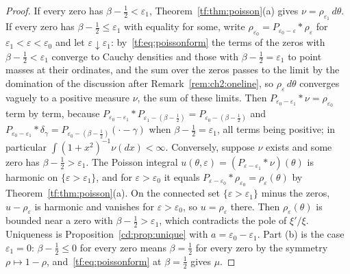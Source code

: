 \begin{proof}
If every zero has $\beta-\tfrac12<\varepsilon_1$, Theorem~\ref{tf:thm:poisson}(a) gives $\nu=\rho_{\varepsilon_1}\,d\theta$. If every zero has $\beta-\tfrac12\le\varepsilon_1$ with equality for some, write $\rho_{\varepsilon_0}=P_{\varepsilon_0-\varepsilon}*\rho_\varepsilon$ for $\varepsilon_1<\varepsilon<\varepsilon_0$ and let $\varepsilon\downarrow\varepsilon_1$: by~\eqref{tf:eq:poissonform} the terms of the zeros with $\beta-\tfrac12<\varepsilon_1$ converge to Cauchy densities and those with $\beta-\tfrac12=\varepsilon_1$ to point masses at their ordinates, and the sum over the zeros passes to the limit by the domination of the discussion after Remark~\ref{rem:ch2:oneline}, so $\rho_\varepsilon\,d\theta$ converges vaguely to a positive measure $\nu$, the sum of these limits. Then $P_{\varepsilon_0-\varepsilon_1}*\nu=\rho_{\varepsilon_0}$ term by term, because $P_{\varepsilon_0-\varepsilon_1}*P_{\varepsilon_1-(\beta-\frac12)}=P_{\varepsilon_0-(\beta-\frac12)}$ and $P_{\varepsilon_0-\varepsilon_1}*\delta_\gamma=P_{\varepsilon_0-(\beta-\frac12)}(\cdot-\gamma)$ when $\beta-\tfrac12=\varepsilon_1$, all terms being positive; in particular $\int(1+x^2)^{-1}\nu(dx)<\infty$. Conversely, suppose $\nu$ exists and some zero has $\beta-\tfrac12>\varepsilon_1$. The Poisson integral $u(\theta,\varepsilon)=(P_{\varepsilon-\varepsilon_1}*\nu)(\theta)$ is harmonic on $\{\varepsilon>\varepsilon_1\}$, and for $\varepsilon>\varepsilon_0$ it equals $P_{\varepsilon-\varepsilon_0}*\rho_{\varepsilon_0}=\rho_\varepsilon(\theta)$ by Theorem~\ref{tf:thm:poisson}(a). On the connected set $\{\varepsilon>\varepsilon_1\}$ minus the zeros, $u-\rho_\varepsilon$ is harmonic and vanishes for $\varepsilon>\varepsilon_0$, so $u=\rho_\varepsilon$ there. Then $\rho_\varepsilon(\theta)$ is bounded near a zero with $\beta-\tfrac12>\varepsilon_1$, which contradicts the pole of $\xi'/\xi$. Uniqueness is Proposition~\ref{cd:prop:unique} with $a=\varepsilon_0-\varepsilon_1$. Part (b) is the case $\varepsilon_1=0$: $\beta-\tfrac12\le0$ for every zero means $\beta=\tfrac12$ for every zero by the symmetry $\rho\mapsto1-\rho$, and~\eqref{tf:eq:poissonform} at $\beta=\tfrac12$ gives $\mu$.
\end{proof}

